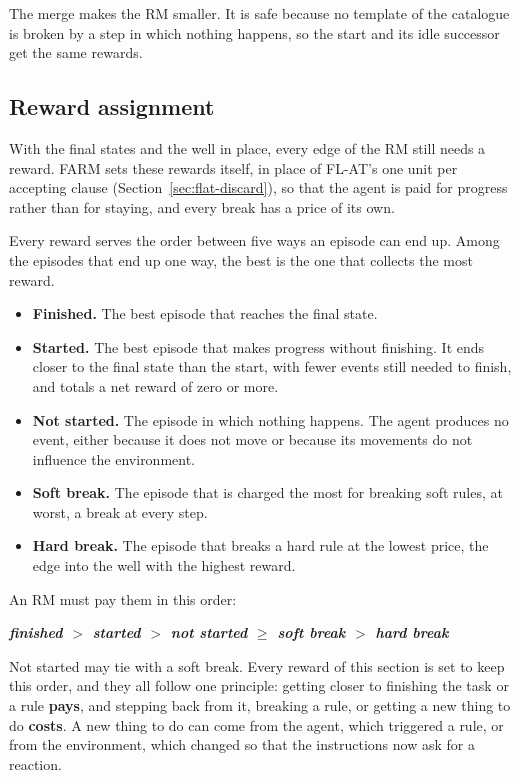 \documentclass[11pt,english,listoffigures,listoftables]{tfgetsinf}
\newcommand{\keyidea}[1]{\par\smallskip\noindent\hspace*{0.6em}{\color{gray!55}\vrule width 1.5pt}\hspace{8pt}\parbox[t]{\dimexpr\linewidth-0.6em-9.5pt\relax}{\itshape #1}\par\smallskip}  %
\begin{document}
The merge makes the RM smaller. It is safe because no template of the catalogue is broken by a step in which nothing happens, so the start and its idle successor get the same rewards.

\subsection{Reward assignment}
\label{sec:reward-assignment}
With the final states and the well in place, every edge of the RM still needs a reward. FARM sets these rewards itself, in place of FL-AT's one unit per accepting clause (Section~\ref{sec:flat-discard}), so that the agent is paid for progress rather than for staying, and every break has a price of its own.

Every reward serves the order between five ways an episode can end up. Among the episodes that end up one way, the best is the one that collects the most reward.

\begin{itemize}
    \item \textbf{Finished.} The best episode that reaches the final state.
    \item \textbf{Started.} The best episode that makes progress without finishing. It ends closer to the final state than the start, with fewer events still needed to finish, and totals a net reward of zero or more.
    \item \textbf{Not started.} The episode in which nothing happens. The agent produces no event, either because it does not move or because its movements do not influence the environment.
    \item \textbf{Soft break.} The episode that is charged the most for breaking soft rules, at worst, a break at every step.
    \item \textbf{Hard break.} The episode that breaks a hard rule at the lowest price, the edge into the well with the highest reward.
\end{itemize}

An RM must pay them in this order:

\keyidea{\centering\upshape\bfseries\boldmath finished $>$ started $>$ not started $\geq$ soft break $>$ hard break}
\noindent Not started may tie with a soft break. Every reward of this section is set to keep this order, and they all follow one principle: getting closer to finishing the task or a rule \textbf{pays}, and stepping back from it, breaking a rule, or getting a new thing to do \textbf{costs}. A new thing to do can come from the agent, which triggered a rule, or from the environment, which changed so that the instructions now ask for a reaction.
\end{document}

